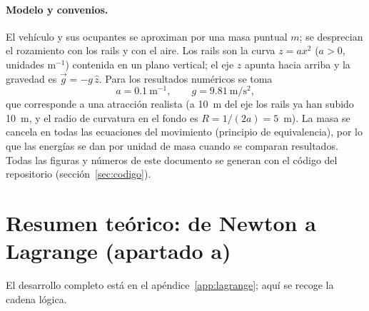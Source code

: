 \documentclass[11pt,a4paper]{article}
\begin{document}
\paragraph{Modelo y convenios.} El vehículo y sus ocupantes se aproximan por una masa puntual $m$; se desprecian el rozamiento con los rails y con el aire.
Los rails son la curva $z=ax^2$ ($a>0$, unidades m$^{-1}$) contenida en un plano vertical; el eje $z$ apunta hacia arriba y
la gravedad es $\vec g=-g\,\hat z$. Para los resultados numéricos se toma
\begin{equation}
 a=0.1\ \mathrm{m^{-1}},\qquad g=9.81\ \mathrm{m/s^2},
\end{equation}
que corresponde a una atracción realista (a 10~m del eje los rails ya han subido 10~m, y el radio de curvatura en el fondo es $R=1/(2a)=5$~m).
La masa se cancela en todas las ecuaciones del movimiento (principio de equivalencia), por lo que las energías se dan por unidad de masa cuando se comparan resultados.
Todas las figuras y números de este documento se generan con el código del repositorio (sección~\ref{sec:codigo}).

\section{Resumen teórico: de Newton a Lagrange (apartado a)}\label{sec:teoria}
El desarrollo completo está en el apéndice~\ref{app:lagrange}; aquí se recoge la cadena lógica.
\end{document}
